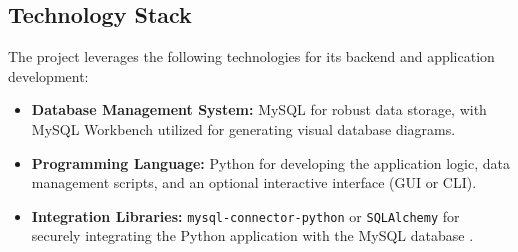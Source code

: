 \subsection{Technology Stack}
The project leverages the following technologies for its backend and application development:

\begin{itemize}
    \item \textbf{Database Management System:} MySQL for robust data storage, with MySQL Workbench utilized for generating visual database diagrams.
    \item \textbf{Programming Language:} Python for developing the application logic, data management scripts, and an optional interactive interface (GUI or CLI).
    \item \textbf{Integration Libraries:} \texttt{mysql-connector-python} or \texttt{SQLAlchemy} for securely integrating the Python application with the MySQL database \cite{mysql_connector_guide, mysql_connector_pypi}.
\end{itemize}